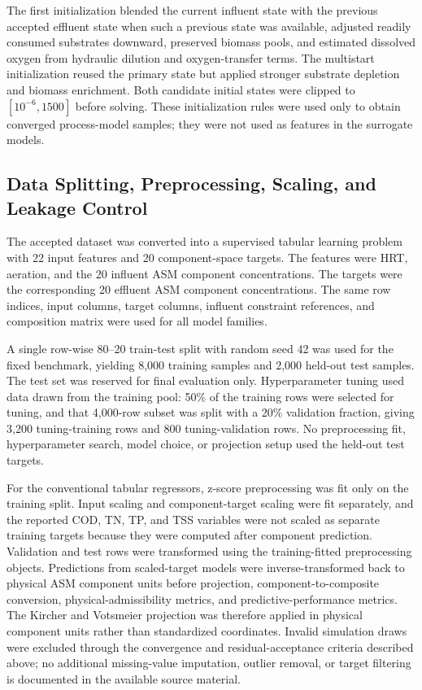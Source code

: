 \documentclass[a4paper,fleqn]{cas-sc}
\begin{document}
The first initialization blended the current influent state with the previous accepted effluent state when such a previous state was available, adjusted readily consumed substrates downward, preserved biomass pools, and estimated dissolved oxygen from hydraulic dilution and oxygen-transfer terms. The multistart initialization reused the primary state but applied stronger substrate depletion and biomass enrichment. Both candidate initial states were clipped to $[10^{-6},1500]$ before solving. These initialization rules were used only to obtain converged process-model samples; they were not used as features in the surrogate models.

\subsection{Data Splitting, Preprocessing, Scaling, and Leakage Control}

The accepted dataset was converted into a supervised tabular learning problem with 22 input features and 20 component-space targets. The features were HRT, aeration, and the 20 influent ASM component concentrations. The targets were the corresponding 20 effluent ASM component concentrations. The same row indices, input columns, target columns, influent constraint references, and composition matrix were used for all model families.

A single row-wise 80--20 train-test split with random seed 42 was used for the fixed benchmark, yielding 8,000 training samples and 2,000 held-out test samples. The test set was reserved for final evaluation only. Hyperparameter tuning used data drawn from the training pool: 50\% of the training rows were selected for tuning, and that 4,000-row subset was split with a 20\% validation fraction, giving 3,200 tuning-training rows and 800 tuning-validation rows. No preprocessing fit, hyperparameter search, model choice, or projection setup used the held-out test targets.

For the conventional tabular regressors, z-score preprocessing was fit only on the training split. Input scaling and component-target scaling were fit separately, and the reported COD, TN, TP, and TSS variables were not scaled as separate training targets because they were computed after component prediction. Validation and test rows were transformed using the training-fitted preprocessing objects. Predictions from scaled-target models were inverse-transformed back to physical ASM component units before projection, component-to-composite conversion, physical-admissibility metrics, and predictive-performance metrics. The Kircher and Votsmeier projection was therefore applied in physical component units rather than standardized coordinates. Invalid simulation draws were excluded through the convergence and residual-acceptance criteria described above; no additional missing-value imputation, outlier removal, or target filtering is documented in the available source material.
\end{document}
